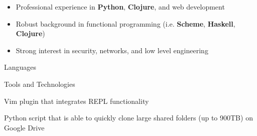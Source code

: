 
\begin{itemize}
    \item Professional experience in \textbf{Python}, \textbf{Clojure}, and web 
        development
    \item Robust background in functional programming (i.e. \textbf{Scheme}, 
        \textbf{Haskell}, \textbf{Clojure})
    \item Strong interest in security, networks, and low level engineering
\end{itemize}

\smallskip


Languages

\smallskip


\divider

Tools and Technologies

\smallskip


\smallskip


Vim plugin that integrates REPL functionality

\divider

Python script that is able to quickly clone large shared folders (up to 900TB) on Google Drive







